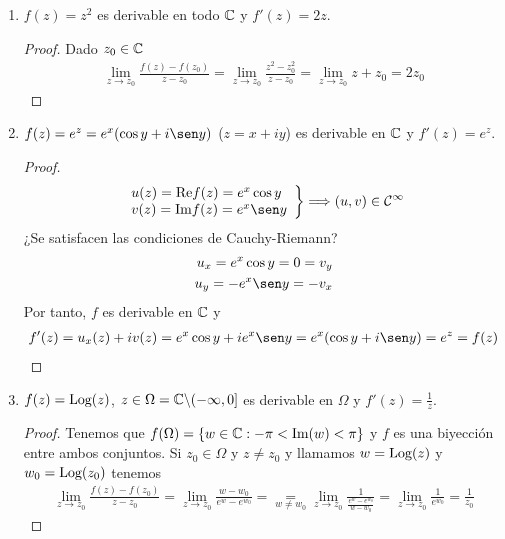 \begin{ejemplo}
\begin{enumerate}
\begin{proof}
              \end{proof}
        \item $f(z) = z^2$ es derivable en todo $\mathbb{C}$ y $f'(z) = 2z$.
              \begin{proof}
                  Dado $z_0 \in \mathbb{C}$
                  \begin{align*}
                      \lim_{z \to z_0}{\frac{f(z) - f(z_0)}{z - z_0}} = \lim_{z \to z_0}{\frac{z^2 - z_0^2}{z - z_0}} = \lim_{z \to z_0}{z + z_0} = 2z_0
                  \end{align*}
              \end{proof}
        \item $f(z) = e^z = e^x(\cos y + i\sen y)$ ($z = x + iy$) es derivable en $\mathbb{C}$ y $f'(z) = e^z$.
              \begin{proof}
                  \begin{align*}
                      \left. \begin{array}{lcc}
                                 u(z) = \re f(z) = e^x \cos y \\
                                 v(z) = \im f(z) = e^x \sen y \\
                             \end{array}
                      \right\} \Longrightarrow (u,v) \in \mathcal{C}^{\infty}
                  \end{align*}
                  ¿Se satisfacen las condiciones de Cauchy-Riemann?
                  \begin{align*}
                      u_x = e^x \cos y = 0 = v_y \\
                      u_y = -e^x \sen y = -v_x
                  \end{align*}
                  Por tanto, $f$ es derivable en $\mathbb{C}$ y
                  \begin{align*}
                      f'(z) = u_x(z) + iv(z) = e^x \cos y + i e^x \sen y = e^x(\cos y + i\sen y) = e^z = f(z)
                  \end{align*}
              \end{proof}
        \item $f(z) = \text{Log}(z)$, $z \in \Omega = \mathbb{C} \backslash (-\infty,0]$ es derivable en $\Omega$ y $f'(z) = \frac{1}{z}$.
              \begin{proof}
                  Tenemos que $f(\Omega) = \{ w \in \mathbb{C} : -\pi < \text{Im}(w) < \pi \}$ y $f$ es una biyección entre ambos conjuntos. Si $z_0 \in \Omega$ y $z \not = z_0$ y llamamos $w = \text{Log}(z)$ y $w_0 = \text{Log}(z_0)$ tenemos
                  \begin{align*}
                      \lim_{z \to z_0}{\frac{f(z) - f(z_0)}{z - z_0}} = \lim_{z \to z_0}{\frac{w - w_0}{e^{w} - e^{w_0}}} = \underset{w \not = w_0}{=} \lim_{z \to z_0}{\frac{1}{\frac{e^{w} - e^{w_0}}{w - w_0}}} = \lim_{z \to z_0}{\frac{1}{e^{w_0}}} = \frac{1}{z_0}
                  \end{align*}
              \end{proof}
    \end{enumerate}
\end{ejemplo}

